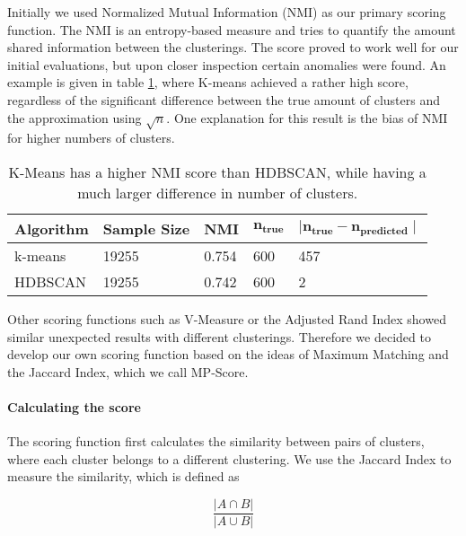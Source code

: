 Initially we used Normalized Mutual Information (NMI) as our primary scoring function. The NMI is an entropy-based measure and tries to quantify the amount shared information between the clusterings. The score proved to work well for our initial evaluations, but upon closer inspection certain anomalies were found. An example is given in table \ref{tab:nmi_kmeans_example}, where K-means achieved a rather high score, regardless of the significant difference between the true amount of clusters and the approximation using $\sqrt{n}$. One explanation for this result is the bias of NMI for higher numbers of clusters\cite{LEI201758}.

\begin{table}[h]
    \centering
    \begin{tabular}{|l|l|l|l|l|}
    \hline
    \textbf{Algorithm} & \textbf{Sample Size} & \textbf{NMI}  & $\mathbf{n_{true}}$ & $\mathbf{ \mid n_{true} - n_{predicted} \mid }$ \\ \hline
    k-means & 19255 & 0.754 & 600 & 457 \\ \hline
    HDBSCAN & 19255 & 0.742 & 600 & 2 \\ \hline
    \end{tabular}
    \caption{K-Means has a higher NMI score than HDBSCAN, while having a much larger difference in number of clusters.}
    \label{tab:nmi_kmeans_example}
\end{table}

Other scoring functions such as V-Measure or the Adjusted Rand Index showed similar unexpected results with different clusterings. Therefore we decided to develop our own scoring function based on the ideas of Maximum Matching\cite{data_mining} and the Jaccard Index, which we call MP-Score.


\paragraph{Calculating the score}

The scoring function first calculates the similarity between pairs of clusters, where each cluster belongs to a different clustering. We use the Jaccard Index to measure the similarity, which is defined as

\begin{equation}
    \label{equ:similarity}
    \frac{|A \cap B|}{|A \cup B|}
\end{equation}


